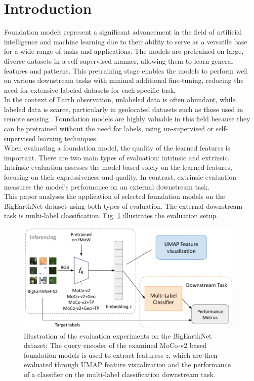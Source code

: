 \section{Introduction}
\label{sec:intro}

Foundation models represent a significant advancement in the field of artificial intelligence and machine learning due to their ability to serve as a versatile base for a wide range of tasks and applications. The models are pretrained on large, diverse datasets in a self supervised manner, allowing them to learn general features and patterns. This pretraining stage enables the models to perform well on various downstream tasks with minimal additional fine-tuning, reducing the need for extensive labeled datasets for each specific task. \cite{foundationModels} \\
In the context of Earth observation, unlabeled data is often abundant, while labeled data is scarce, particularly in geolocated datasets such as those used in remote sensing \cite{geoAwareSelfSuper}. Foundation models are highly valuable in this field because they can be pretrained without the need for labels, using un-supervised or self-supervised learning techniques. \\
When evaluating a foundation model, the quality of the learned features is important. There are two main types of evaluation: intrinsic and extrinsic. Intrinsic evaluation assesses the model based solely on the learned features, focusing on their expressiveness and quality. In contrast, extrinsic evaluation measures the model's performance on an external downstream task. \cite{foundationModels} \\
This paper analyses the application of selected foundation models on the BigEarthNet dataset \cite{bigEartNetMM} using both types of evaluation. The external downstream task is multi-label classification. Fig. \ref{fig:setup} illustrates the evaluation setup.

\begin{figure}[t]
  \centering
   \includegraphics[width=\linewidth]{figures/ExperimentSetup.png}
   \caption{Illustration of the evaluation experiments on the BigEarthNet dataset: The query encoder of the examined MoCo-v2 based foundation models is used to extract featuress $z$, which are then evaluated through UMAP feature visualization and the performance of a classifier on the multi-label classification downstream task.}
   \label{fig:setup}
\end{figure}

